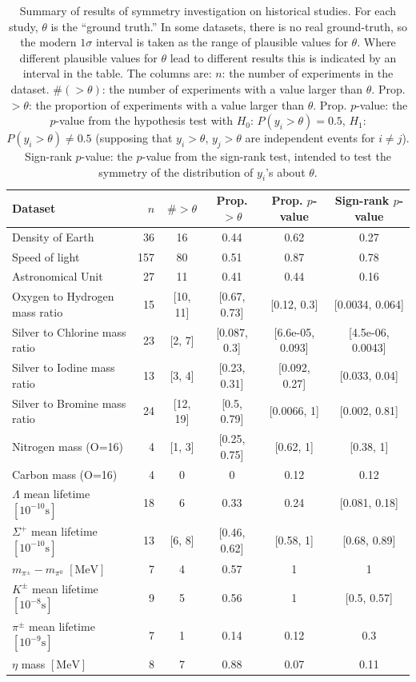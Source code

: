 \documentclass[12pt]{article}
\begin{document}
\begin{table}
  \centering
  \caption{Summary of results of symmetry investigation on historical studies. For each study, $\theta$ is the ``ground truth.'' In some datasets, there is no real ground-truth, so the modern $1\sigma$ interval is taken as the range of plausible values for $\theta$. Where different plausible values for $\theta$ lead to different results this is indicated by an interval in the table. The columns are: $n$: the number of experiments in the dataset. $\#(>\theta)$: the number of experiments with a value larger than $\theta$. Prop. $>\theta$: the proportion of experiments with a value larger than $\theta$. Prop. $p$-value: the $p$-value from the hypothesis test with $H_0$: $P(y_i>\theta)=0.5$, $H_1$: $P(y_i>\theta)\neq 0.5$ (supposing that $y_i>\theta$, $y_j>\theta$ are independent events for $i\neq j$). Sign-rank $p$-value: the $p$-value from the sign-rank test, intended to test the symmetry of the distribution of $y_i$'s about $\theta$.}
  \label{tab:hist-sym}
  \smaller
  \begin{tabular}{l|rcccc}
    Dataset & $n$ & $\#>\theta$ & Prop. $>\theta$ & Prop. $p$-value & Sign-rank $p$-value \\\hline
    Density of Earth & 36 & 16 & 0.44 & 0.62 & 0.27 \\
    Speed of light & 157 & 80 & 0.51 & 0.87 & 0.78 \\
    Astronomical Unit & 27 & 11 & 0.41 & 0.44 & 0.16 \\
    Oxygen to Hydrogen mass ratio & 15 & [10, 11] & [0.67, 0.73] & [0.12, 0.3] & [0.0034, 0.064] \\
    Silver to Chlorine mass ratio & 23 & [2, 7] & [0.087, 0.3] & [6.6e-05, 0.093] & [4.5e-06, 0.0043] \\
    Silver to Iodine mass ratio & 13 & [3, 4] & [0.23, 0.31] & [0.092, 0.27] & [0.033, 0.04] \\
    Silver to Bromine mass ratio & 24 & [12, 19] & [0.5, 0.79] & [0.0066, 1] & [0.002, 0.81] \\
    Nitrogen mass (O=16) & 4 & [1, 3] & [0.25, 0.75] & [0.62, 1] & [0.38, 1] \\
    Carbon mass (O=16) & 4 & 0 & 0 & 0.12 & 0.12 \\
    $\Lambda$ mean lifetime $\mathrm{[10^{-10}s]}$ & 18 & 6 & 0.33 & 0.24 & [0.081, 0.18] \\
    $\Sigma^+$ mean lifetime $\mathrm{[10^{-10}s]}$ & 13 & [6, 8] & [0.46, 0.62] & [0.58, 1] & [0.68, 0.89] \\
    $m_{\pi^\pm}-m_{\pi^0}$ $\mathrm{[MeV]}$ & 7 & 4 & 0.57 & 1 & 1 \\
    $K^\pm$ mean lifetime $\mathrm{[10^{-8}s]}$ & 9 & 5 & 0.56 & 1 & [0.5, 0.57] \\
    $\pi^\pm$ mean lifetime $\mathrm{[10^{-9}s]}$ & 7 & 1 & 0.14 & 0.12 & 0.3 \\
    $\eta$ mass $\mathrm{[MeV]}$ & 8 & 7 & 0.88 & 0.07 & 0.11 \\
  \end{tabular}
\end{table}
\end{document}
